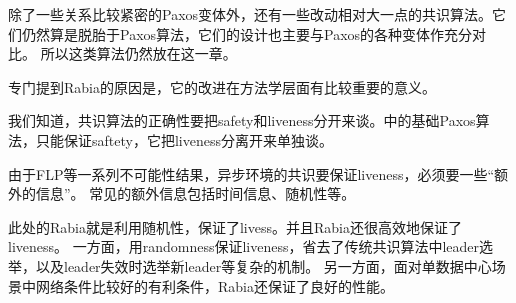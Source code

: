 除了一些关系比较紧密的Paxos变体外，还有一些改动相对大一点的共识算法。它们仍然算是脱胎于Paxos算法，它们的设计也主要与Paxos的各种变体作充分对比。
所以这类算法仍然放在这一章。

专门提到Rabia的原因是，它的改进在方法学层面有比较重要的意义。

我们知道，共识算法的正确性要把safety和liveness分开来谈。\cite{Lamport01}中的基础Paxos算法，只能保证saftety，它把liveness分离开来单独谈。

由于FLP等一系列不可能性结果，异步环境的共识要保证liveness，必须要一些“额外的信息”。
常见的额外信息包括时间信息、随机性等。

此处的Rabia就是利用随机性，保证了livess。并且Rabia还很高效地保证了liveness。
一方面，用randomness保证liveness，省去了传统共识算法中leader选举，以及leader失效时选举新leader等复杂的机制。
另一方面，面对单数据中心场景中网络条件比较好的有利条件，Rabia还保证了良好的性能。

